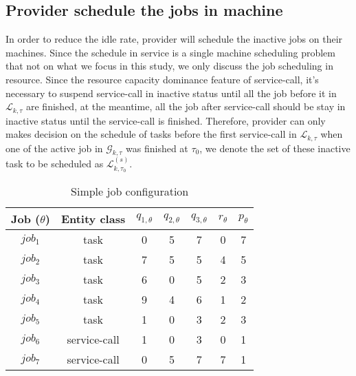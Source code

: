 

\subsection{Provider schedule the jobs in machine} %
\label{sub:schedule_the_jobs_in_machine}
In order to reduce the idle rate, provider will schedule the inactive jobs on their machines. Since the schedule in service is a single machine scheduling problem that not on  what we focus in this study, we only discuss the job scheduling in resource. Since the  resource capacity dominance feature of service-call, it's necessary to suspend service-call in inactive status until all the job before it in $\mathcal{L}_{k,\tau}$ are finished, at the meantime, all the job after service-call should be stay in inactive status until the service-call is finished.
Therefore, provider can only makes decision on the schedule of tasks before the first service-call in $\mathcal{L}_{k,\tau}$ when one of the active job in $\mathcal{G}_{k,\tau}$ was finished at $\tau_0$, we denote the set of these inactive task to be scheduled as $\mathcal{L}^{(s)}_{k,\tau_0}$.

\begin{table}[htbp]
  \centering
  \scriptsize
  \caption{Simple job configuration}
    \begin{tabular}{ccccccc}
    \toprule
    Job ($\theta$) & Entity class& $q_{1,\theta}$ & $q_{2,\theta}$ & $q_{3,\theta}$ & $r_\theta$ & $p_\theta$ \\
    \midrule
    $job_1$ & task& 0     & 5     & 7     & 0     & 7 \\
    $job_2$ & task& 7     & 5     & 5     & 4     & 5 \\
    $job_3$ & task& 6     & 0     & 5     & 2     & 3 \\
    $job_4$ & task& 9	 & 4  & 6 & 1 &2 \\
    $job_5$ & task& 1 & 0 & 3 & 2 & 3\\
    $job_6$ & service-call& 1     & 0     & 3    & 0     & 1 \\
    $job_7$ & service-call& 0     & 5     & 7     & 7     & 1 \\
    \bottomrule
    \end{tabular}%
  \label{tab:simplejobconfiguration}%
\end{table}%

